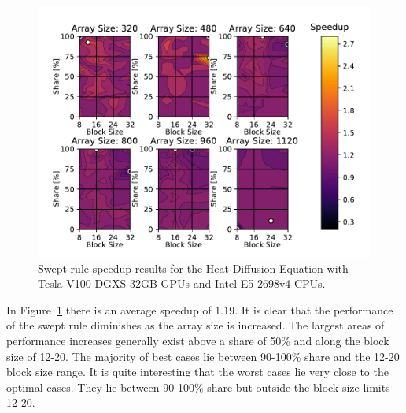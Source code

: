 \documentclass[journal,article,submit,moreauthors,pdftex]{Definitions/mdpi}
\newcommand\fs{1}
\def\newCPU{Intel E5-2698v4} %
\def\newGPU{Tesla V100-DGXS-32GB}
\begin{document}
\begin{figure}
    \widefigure
    \begin{center}
        \includegraphics[scale=\fs, trim={0.75cm 0.4cm 0.8cm 0.7cm},clip]{figs/speedUpheatNew.pdf}
        \caption{Swept rule speedup results for the Heat Diffusion Equation with \newGPU{} GPUs and \newCPU{} CPUs.}
        \label{fig:newSpeedupHeat}
    \end{center}
\end{figure}
\begin{paracol}{2}
\linenumbers
\switchcolumn

In Figure~\ref{fig:newSpeedupHeat} there is an average speedup of 1.19. It is clear that the performance of the swept rule diminishes as the array size is increased. The largest areas of performance increases generally exist above a share of 50\% and along the block size of 12-20. The majority of best cases lie between 90-100\% share and the 12-20 block size range. It is quite interesting that the worst cases lie very close to the optimal cases. They lie between 90-100\% share but outside the block size limits 12-20.

\end{paracol}
\end{document}
